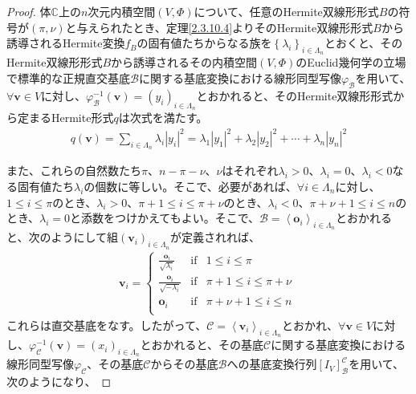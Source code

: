 \documentclass[dvipdfmx]{jsarticle}
\begin{document}
\begin{proof}
体$\mathbb{C}$上の$n$次元内積空間$(V,\varPhi)$について、任意のHermite双線形形式$B$の符号が$(\pi,\nu)$と与えられたとき、定理\ref{2.3.10.4}よりそのHermite双線形形式$B$から誘導されるHermite変換$f_{B}$の固有値たちからなる族を$\left\{ \lambda_{i} \right\}_{i \in \varLambda_{n}}$とおくと、そのHermite双線形形式$B$から誘導されるその内積空間$(V,\varPhi)$のEuclid幾何学の立場で標準的な正規直交基底$\mathcal{B}$に関する基底変換における線形同型写像$\varphi_{\mathcal{B}}$を用いて、$\forall\mathbf{v} \in V$に対し、$\varphi_{\mathcal{B}}^{- 1}\left( \mathbf{v} \right) = \left( y_{i} \right)_{i \in \varLambda_{n}}$とおかれると、そのHermite双線形形式から定まるHermite形式$q$は次式を満たす。
\begin{align*}
q\left( \mathbf{v} \right) = \sum_{i \in \varLambda_{n}} {\lambda_{i}\left| y_{i} \right|^{2}} = \lambda_{1}\left| y_{1} \right|^{2} + \lambda_{2}\left| y_{2} \right|^{2} + \cdots + \lambda_{n}\left| y_{n} \right|^{2}
\end{align*}\par
また、これらの自然数たち$\pi$、$n - \pi - \nu$、$\nu$はそれぞれ$\lambda_{i} > 0$、$\lambda_{i} = 0$、$\lambda_{i} < 0$なる固有値たち$\lambda_{i}$の個数に等しい。そこで、必要があれば、$\forall i \in \varLambda_{n}$に対し、$1 \leq i \leq \pi$のとき、$\lambda_{i} > 0$、$\pi + 1 \leq i \leq \pi + \nu$のとき、$\lambda_{i} < 0$、$\pi + \nu + 1 \leq i \leq n$のとき、$\lambda_{i} = 0$と添数をつけかえてもよい。そこで、$\mathcal{B} =\left\langle \mathbf{o}_{i} \right\rangle_{i \in \varLambda_{n}}$とおかれると、次のようにして組$\left( \mathbf{v}_{i} \right)_{i \in \varLambda_{n}}$が定義されれば、
\begin{align*}
\mathbf{v}_{i} = \left\{ \begin{matrix}
\frac{\mathbf{o}_{i}}{\sqrt{\lambda_{i}}} & \mathrm{if} & 1 \leq i \leq \pi \\
\frac{\mathbf{o}_{i}}{\sqrt{- \lambda_{i}}} & \mathrm{if} & \pi + 1 \leq i \leq \pi + \nu \\
\mathbf{o}_{i} & \mathrm{if} & \pi + \nu + 1 \leq i \leq n \\
\end{matrix} \right.\ 
\end{align*}
これらは直交基底をなす。したがって、$\mathcal{C}=\left\langle \mathbf{v}_{i} \right\rangle_{i \in \varLambda_{n}}$とおかれ、$\forall\mathbf{v} \in V$に対し、$\varphi_{\mathcal{C}}^{- 1}\left( \mathbf{v} \right) = \left( x_{i} \right)_{i \in \varLambda_{n}}$とおかれると、その基底$\mathcal{C}$に関する基底変換における線形同型写像$\varphi_{\mathcal{C}}$、その基底$\mathcal{C}$からその基底$\mathcal{B}$への基底変換行列$\left[ I_{V} \right]_{\mathcal{B}}^{\mathcal{C}}$を用いて、次のようになり、

\end{proof}
\end{document}
